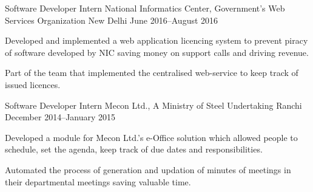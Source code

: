 
\begin{cventries}

\cventry%
  {Software Developer Intern} %
  {National Informatics Center, Government's Web Services Organization} %
  {New Delhi} %
  {June 2016--August 2016} %
  {%
    \begin{cvitems} %
      \item{Developed and implemented a web application licencing system to
            prevent piracy of software developed by NIC saving money on support
            calls and driving revenue.}
      \item{Part of the team that implemented the centralised web-service to
            keep track of issued licences.}
    \end{cvitems}
  }

\cventry%
  {Software Developer Intern} %
  {Mecon Ltd., A Ministry of Steel Undertaking} %
  {Ranchi} %
  {December 2014--January 2015} %
  {%
    \begin{cvitems} %
      \item{Developed a module for Mecon Ltd.'s e-Office solution which allowed
            people to schedule, set the agenda, keep track of due dates and
            responsibilities.}
      \item{Automated the process of generation and updation of minutes of
            meetings in their departmental meetings saving valuable time.}
    \end{cvitems}
  }

\end{cventries}
